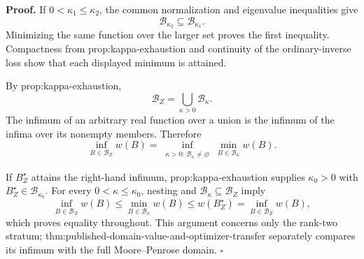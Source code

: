 \textbf{Proof.}
If \(0<\kappa_1\le\kappa_2\), the common normalization and eigenvalue inequalities give
\[
 \mathcal B_{\kappa_2}\subseteq\mathcal B_{\kappa_1}.
\]
Minimizing the same function over the larger set proves the first inequality.  Compactness from prop:kappa-exhaustion and continuity of the ordinary-inverse loss show that each displayed minimum is attained.

By prop:kappa-exhaustion,
\[
 \mathcal B_Z=\bigcup_{\kappa>0}\mathcal B_\kappa.
\]
The infimum of an arbitrary real function over a union is the infimum of the infima over its nonempty members.  Therefore
\[
 \inf_{B\in\mathcal B_Z}w(B)
 =\inf_{\substack{\kappa>0:\,\mathcal B_\kappa\ne\varnothing}}
 \min_{B\in\mathcal B_\kappa}w(B).
\]

If \(B_Z^\star\) attains the right-hand infimum, prop:kappa-exhaustion supplies \(\kappa_0>0\) with \(B_Z^\star\in\mathcal B_{\kappa_0}\).  For every \(0<\kappa\le\kappa_0\), nesting and \(\mathcal B_\kappa\subseteq\mathcal B_Z\) imply
\[
 \inf_{B\in\mathcal B_Z}w(B)
 \le\min_{B\in\mathcal B_\kappa}w(B)
 \le w(B_Z^\star)
 =\inf_{B\in\mathcal B_Z}w(B),
\]
which proves equality throughout.  This argument concerns only the rank-two stratum; thm:published-domain-value-and-optimizer-transfer separately compares its infimum with the full Moore--Penrose domain. \(\square\)